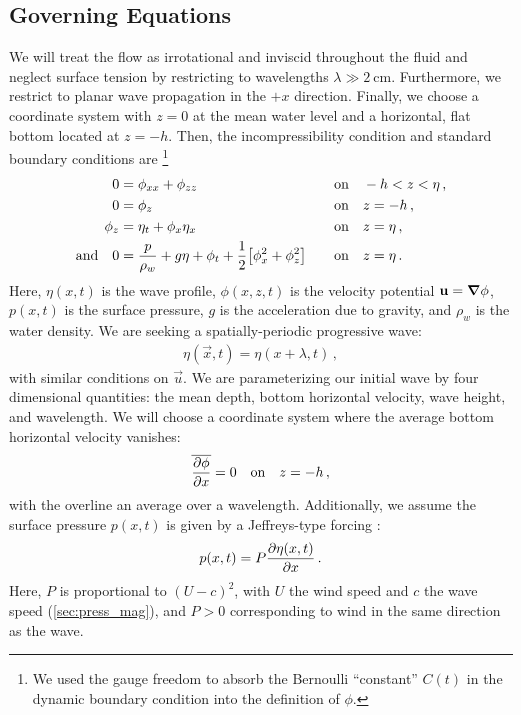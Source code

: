\documentclass{jfm}
\begin{document}
\subsection{Governing Equations}
We will treat the flow as irrotational and inviscid throughout the
fluid and neglect surface tension by restricting to wavelengths $\lambda
\gg \SI{2}{\centi\meter}$.
Furthermore, we restrict to planar wave propagation in the $+x$
direction.
Finally, we choose a coordinate system with $z=0$ at the mean water level and
a horizontal, flat bottom located at $z=-h$.
Then, the incompressibility condition and standard boundary conditions
are%
\footnote{
  We used the gauge freedom to absorb the Bernoulli ``constant'' $C(t)$
  in the dynamic boundary condition into the definition of $\phi$.
}
\begin{alignat}{2}
  0 &= \phi_{xx} + \phi_{zz} &&\qq{on}
  -h < z < \eta \,, \label{eq:laplace}\\
  0 &= \phi_{z} &&\qq{on} z=-h \,, \label{eq:bottom_bc}\\
  \phi_{z} &= \eta_{t} + \phi_{x} \eta_{x} &&\qq{on} z = \eta \,,
  \label{eq:kinematic_bc}\\
  \qq*{and} 0 &= \frac{p}{\rho_w} + g\eta + \phi_{t} +
  \frac{1}{2} \bqty{\phi_{x}^2 + \phi_{z}^2} &&\qq{on} z=
  \eta \,. \label{eq:dynamic_bc}
\end{alignat}
Here, $\eta(x,t)$ is the wave profile, $\phi(x,z,t)$ is the velocity
potential $\mathbf{\bm{u}} = \grad{\phi}$, $p(x,t)$ is the surface pressure,
$g$ is the acceleration due to gravity, and $\rho_w$ is the water
density.
We are seeking a spatially-periodic progressive wave:
\begin{gather}
  \eta(\vec{x},t) = \eta(x + \lambda, t) \,,
\end{gather}
with similar conditions on $\vec{u}$.
We are parameterizing our initial wave by four dimensional quantities:
the mean depth, bottom horizontal velocity, wave height, and wavelength.
We will choose a coordinate system where the average bottom horizontal
velocity vanishes:
\begin{equation}
  \overline{ \pdv{\phi}{x} } = 0 \qq{on} z=-h \,,
  \label{eq:bot_bc_horz}
\end{equation}
with the overline an average over a wavelength.
Additionally, we assume the surface pressure $p(x,t)$ is given by a
Jeffreys-type forcing \citep{jeffreys1925formation}:
\begin{equation}
  p(x,t) = P \pdv{\eta(x,t)}{x} \,.
\end{equation}
Here, $P$ is proportional to $(U-c)^2$, with $U$ the wind speed and $c$
the wave speed (\cf \cref{sec:press_mag}), and $P>0$ corresponding to wind in
the same direction as the wave.
\end{document}
